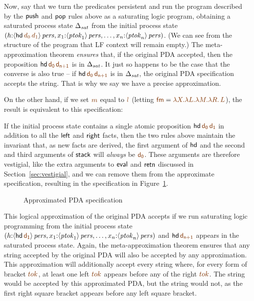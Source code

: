 Now, say that we turn the predicates persistent and  run the program
described by the ${\sf push}$ and ${\sf pop}$ rules above as a
saturating logic program, obtaining a saturated process state
$\Delta_{\it sat}$ from the initial process state $(h{:}\ispers{\susp{{\sf
      hd}\,\lf{d_0}\,\lf{d_1}}}, x_1{:}\ispers{\susp{{\it ptok}_1}}, \ldots,
x_n{:}\ispers{\susp{{\it ptok}_n}})$. (We can see from the
structure of the program that LF context will remain empty.)  The
meta-approximation theorem {\it ensures} that, if the original PDA
accepted, then the proposition ${\sf hd}\,\lf{\sf d_0}\,\lf{\sf d_{n+1}}$ is
in $\Delta_{\it sat}$. It just so happens to be the case that the
converse is also true -- if ${\sf hd}\,\lf{\sf d_0}\,\lf{\sf d_{n+1}}$ is in
$\Delta_{\it sat}$, the original PDA specification accepts the string. 
That is why we say we have
a precise approximation.

On the other hand, if we set $\lf{m}$ equal to $\lf{l}$ 
(letting $\lf{\sf fm} = \lf{\lambda X. \lambda L. \lambda M. \lambda R.\, L}$), 
the result is equivalent to this specification:

\smallskip
{}
\smallskip

\noindent
If the initial process state contains a single atomic proposition
${\sf hd}\,\lf{\sf d_0}\,\lf{\sf d_1}$ in addition to all the ${\sf
  left}$ and ${\sf right}$ facts, then the two rules above maintain
the invariant that, as new facts are derived, the first argument of
${\sf hd}$ and the second and third arguments of ${\sf stack}$ will
{\it always} be $\lf{\sf d_0}$.  These arguments are therefore vestigial,
like the extra arguments to ${\sf eval}$ and ${\sf retn}$ discussed in
Section~\ref{sec:vestigial}, and we can remove them from the
approximate specification, resulting in the specification in
Figure~\ref{fig:pda-pers-approx2}.

\begin{figure}[ht]
\caption{Approximated PDA specification}
\label{fig:pda-pers-approx2}
\end{figure}

This logical approximation of the original PDA accepts if we run
saturating logic programming from the initial process state
$(h{:}\ispers{\susp{{\sf hd}\,\lf{\sf d_1}}}, x_1{:}\ispers{\susp{{\it
      ptok}_1}}, \ldots, x_n{:}\ispers{\susp{{\it ptok}_n}})$ and
${\sf hd}\,\lf{\sf d_{n+1}}$ appears in the saturated process
state. Again, the meta-approximation theorem ensures that any string
accepted by the original PDA will also be accepted by any
approximation. This approximation will additionally accept every
string where, for every form of bracket $\lf{tok}$, at least one left
$\lf{tok}$ appears before any of the right $\lf{tok}$. The string
\obj{\mbox{\sf [ ] ] ] ( ( )}} would be accepted by this approximated
PDA, but the string \obj{\mbox{\sf ( ) ] [ [ ]}} would not, as the
first right square bracket appears before any left square
bracket. 


